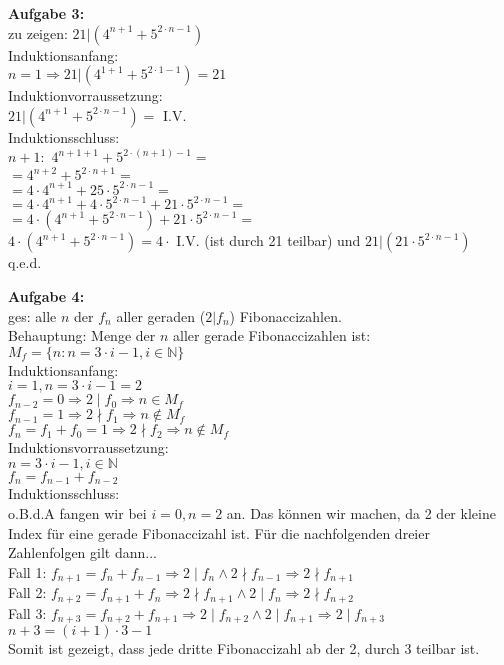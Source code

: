 \documentclass[a4paper]{scrartcl}
\begin{document}
	\begin{flushleft}
		\textbf{Aufgabe 3:}\\	
		zu zeigen: $21|(4^{n+1} + 5^{2\cdot n-1})$\\[1em]
		Induktionsanfang:\\
		$n=1\Rightarrow 21|(4^{1+1} + 5^{2\cdot 1-1}) = 21$\\[1em]
		Induktionvorraussetzung:\\
		$21|(4^{n+1} + 5^{2\cdot n-1}) =$ I.V.\\[1em]
		Induktionsschluss:\\
		$n+1:$ $4^{n+1+1} + 5^{2\cdot(n+1)-1}=$\\
		$=4^{n+2} + 5^{2\cdot n+1}=$\\
		$=4\cdot 4^{n+1} + 25\cdot 5^{2\cdot n-1}=$\\
		$=4\cdot 4^{n+1} + 4\cdot 5^{2\cdot n-1} + 21\cdot 5^{2\cdot n-1}=$\\
		$=4\cdot (4^{n+1} + 5^{2\cdot n-1}) + 21\cdot 5^{2\cdot n-1}=$\\
		$4\cdot (4^{n+1} + 5^{2\cdot n-1})=4\cdot$ I.V. (ist durch 21 teilbar) und $21| (21\cdot 5^{2\cdot n-1})$\\
		q.e.d.\\[1em]
	\end{flushleft}
	\begin{flushleft}
		\textbf{Aufgabe 4:}\\
		ges: alle $n$ der $f_n$ aller geraden ($2|f_n$) Fibonaccizahlen.\\
		Behauptung: Menge der $n$ aller gerade Fibonaccizahlen ist: $M_f= \{n:n=3\cdot i-1,i\in\mathbb{N}\}$\\[1em]
		Induktionsanfang:\\
		$i=1, n=3\cdot i-1=2$\\
		$f_{n-2} = 0 \Rightarrow 2\mid f_0 \Rightarrow n\in M_f$\\
		$f_{n-1} = 1 \Rightarrow 2\nmid f_1 \Rightarrow n\notin M_f$\\
		$f_{n} = f_1 + f_0 = 1 \Rightarrow 2\nmid f_2 \Rightarrow n\notin M_f$\\[1em]
		Induktionsvorraussetzung:\\
		$n= 3\cdot i-1,i\in\mathbb{N}$\\
		$f_{n} = f_{n-1} + f_{n-2}$\\[1em]
		Induktionsschluss:\\
		o.B.d.A fangen wir bei $i=0, n=2$ an. Das können wir machen, da 2 der kleine Index für eine gerade Fibonaccizahl ist. Für die nachfolgenden dreier Zahlenfolgen gilt dann...\\
		Fall 1: $f_{n+1} = f_{n} + f_{n-1}\Rightarrow 2\mid f_{n}\wedge 2\nmid f_{n-1}\Rightarrow 2\nmid f_{n+1}$\\
		Fall 2: $f_{n+2} = f_{n+1} + f_{n}\Rightarrow 2\nmid f_{n+1}\wedge 2\mid f_{n}\Rightarrow 2\nmid f_{n+2}$\\
		Fall 3: $f_{n+3} = f_{n+2} + f_{n+1}\Rightarrow 2\mid f_{n+2}\wedge 2\mid f_{n+1}\Rightarrow 2\mid f_{n+3}$\\[1em]
		$n+3=(i+1)\cdot 3-1$\\
		Somit ist gezeigt, dass jede dritte Fibonaccizahl ab der 2, durch 3 teilbar ist.\\[1em]
	\end{flushleft}
\end{document}
